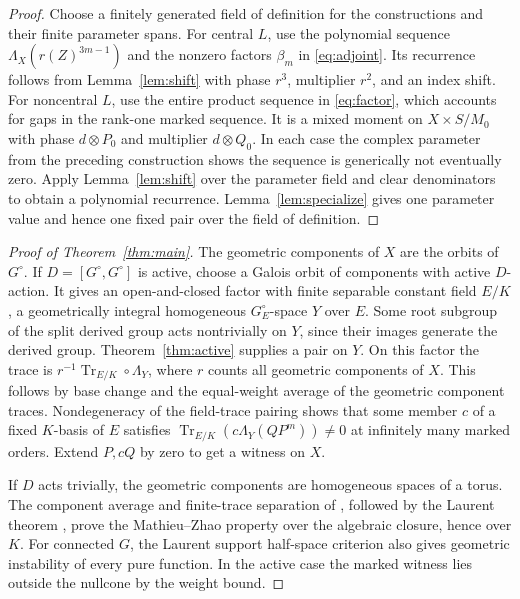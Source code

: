 \documentclass[11pt]{article}
\begin{document}
\begin{proof}
Choose a finitely generated field of definition for the constructions
and their finite parameter spans. For central \(L\), use the polynomial
sequence \(\Lambda_X(r(Z)^{3m-1})\) and the nonzero factors
\(\beta_m\) in \eqref{eq:adjoint}. Its recurrence follows from
Lemma~\ref{lem:shift} with phase \(r^3\), multiplier \(r^2\), and an
index shift. For noncentral \(L\), use the entire product sequence
in \eqref{eq:factor}, which accounts for gaps in the rank-one marked
sequence. It is a mixed moment on \(X\times S/M_0\) with phase
\(d\otimes P_0\) and multiplier \(d\otimes Q_0\). In each case the
complex parameter from the preceding construction shows the sequence
is generically not eventually zero. Apply Lemma~\ref{lem:shift}
over the parameter field and clear denominators to obtain a polynomial
recurrence. Lemma~\ref{lem:specialize} gives one parameter value and
hence one fixed pair over the field of definition.
\end{proof}

\begin{proof}[Proof of Theorem~\ref{thm:main}]
The geometric components of \(X\) are the orbits of \(G^\circ\).
If \(D=[G^\circ,G^\circ]\) is active, choose a Galois orbit of
components with active \(D\)-action. It gives an open-and-closed
factor with finite separable constant field \(E/K\), a geometrically
integral homogeneous \(G^\circ_E\)-space \(Y\) over \(E\).
Some root subgroup of the split derived group acts nontrivially
on \(Y\), since their images generate the derived group.
Theorem~\ref{thm:active} supplies a pair on \(Y\).
On this factor the trace is \(r^{-1}\operatorname{Tr}_{E/K}\circ
\Lambda_Y\), where \(r\) counts all geometric components of \(X\).
This follows by base change and the equal-weight average of the
geometric component traces. Nondegeneracy of the field-trace
pairing shows that some member \(c\) of a fixed \(K\)-basis of \(E\)
satisfies \(\operatorname{Tr}_{E/K}(c\Lambda_Y(QP^m))\ne0\) at
infinitely many marked orders. Extend \(P,cQ\) by zero to get a
witness on \(X\).

If \(D\) acts trivially, the geometric components are homogeneous
spaces of a torus. The component average and finite-trace separation
of \cite[Section~7]{Complex}, followed by the Laurent theorem
\cite{DvK}, prove the Mathieu--Zhao property over the algebraic
closure, hence over \(K\). For connected \(G\), the Laurent
support half-space criterion also gives geometric instability
of every pure function. In the active case the marked witness
lies outside the nullcone by the weight bound.
\end{proof}
\end{document}
